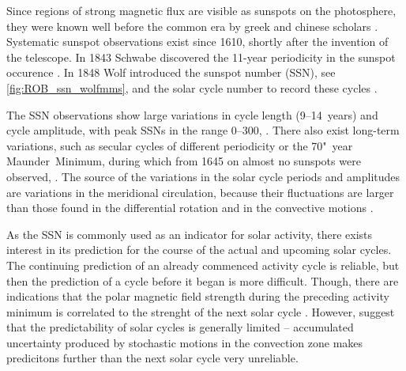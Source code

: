 Since regions of strong magnetic flux are visible as sunspots on the photosphere, they were known well before the common era by greek and chinese scholars \citep{Vaquero2007,Clark1978}. %
Systematic sunspot observations exist since 1610, shortly after the invention of the telescope. In 1843 Schwabe discovered the 11-year periodicity in the sunspot occurence \citep[p.~124]{Schroeder2004}. In 1848 Wolf introduced the sunspot number (SSN), see \autoref{fig:ROB_ssn_wolfmms}, and the solar cycle number to record these cycles \citep{Hathaway2015}.	%
\begin{figure}[htb]
\end{figure}
The SSN observations show large variations in cycle length (9--14~years) and cycle amplitude, with peak SSNs in the range 0--300, \citep{Hathaway2015}. There also exist long-term variations, such as secular cycles of different periodicity or the 70"~year Maunder~Minimum, during which from 1645 on almost no sunspots were observed, \citep{Maunder1890}.	%
The source of the variations in the solar cycle periods and amplitudes are variations in the meridional circulation, because their fluctuations are larger than those found in the differential rotation and in the convective motions \citep{Hathaway2015}.

As the SSN is commonly used as an indicator for solar activity, there exists interest in its prediction for the course of the actual and upcoming solar cycles. The continuing prediction of an already commenced activity cycle is reliable, but then the prediction of a cycle before it began is more difficult. Though, there are indications that the polar magnetic field strength during the preceding activity minimum is correlated to the strenght of the next solar cycle \citep{Schatten1987}. However, \citet{Hathaway2016} suggest that the predictability of solar cycles is generally limited -- accumulated uncertainty produced by stochastic motions in the convection zone makes predicitons further than the next solar cycle very unreliable.


